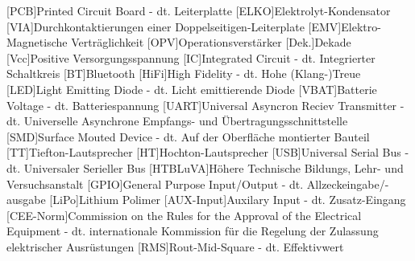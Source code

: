 
\begin{acronym}[ACRONYM]
[PCB]{Printed Circuit Board - dt. Leiterplatte}
[ELKO]{Elektrolyt-Kondensator}
[VIA]{Durchkontaktierungen einer Doppelseitigen-Leiterplate}
[EMV]{Elektro-Magnetische Verträglichkeit}
[OPV]{Operationsverstärker}
[Dek.]{Dekade}
[Vcc]{Positive Versorgungsspannung}
[IC]{Integrated Circuit - dt. Integrierter Schaltkreis}
[BT]{Bluetooth}
[HiFi]{High Fidelity - dt. Hohe (Klang-)Treue}
[LED]{Light Emitting Diode - dt. Licht emittierende Diode}
[VBAT]{Batterie Voltage - dt. Batteriespannung}
[UART]{Universal Asyncron Reciev Transmitter - dt. Universelle Asynchrone Empfangs- und Übertragungsschnittstelle}
[SMD]{Surface Mouted Device - dt. Auf der Oberfläche montierter Bauteil}
[TT]{Tiefton-Lautsprecher}
[HT]{Hochton-Lautsprecher}
[USB]{Universal Serial Bus - dt. Universaler Serieller Bus}
[HTBLuVA]{Höhere Technische Bildungs, Lehr- und Versuchsanstalt}
[GPIO]{General Purpose Input/Output - dt. Allzeckeingabe/-ausgabe}
[LiPo]{Lithium Polimer}
[AUX-Input]{Auxilary Input - dt. Zusatz-Eingang}
[CEE-Norm]{Commission on the Rules for the Approval of the Electrical Equipment - dt. internationale Kommission für die Regelung der Zulassung elektrischer Ausrüstungen}
[RMS]{Rout-Mid-Square - dt. Effektivwert}



\end{acronym}\newpage

